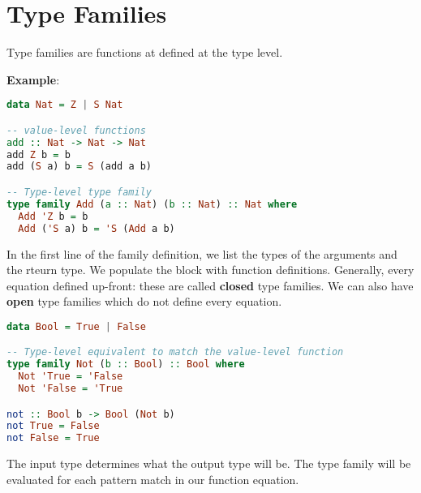 \section{Type Families}

Type families are functions at defined at the type level.

\textbf{Example}:
\begin{lstlisting}[language=haskell]
data Nat = Z | S Nat

-- value-level functions
add :: Nat -> Nat -> Nat
add Z b = b
add (S a) b = S (add a b)

-- Type-level type family
type family Add (a :: Nat) (b :: Nat) :: Nat where
  Add 'Z b = b
  Add ('S a) b = 'S (Add a b)
\end{lstlisting}

In the first line of the family definition, we list the types of the arguments and the rteurn type. We populate the block with function definitions.
Generally, every equation defined up-front: these are called \textbf{closed} type families. We can also have \textbf{open} type families which do not define every equation.

\begin{lstlisting}[language=haskell]
data Bool = True | False

-- Type-level equivalent to match the value-level function
type family Not (b :: Bool) :: Bool where
  Not 'True = 'False
  Not 'False = 'True

not :: Bool b -> Bool (Not b)
not True = False
not False = True
\end{lstlisting}

The input type determines what the output type will be. The type family will be evaluated for each pattern match in our function equation.